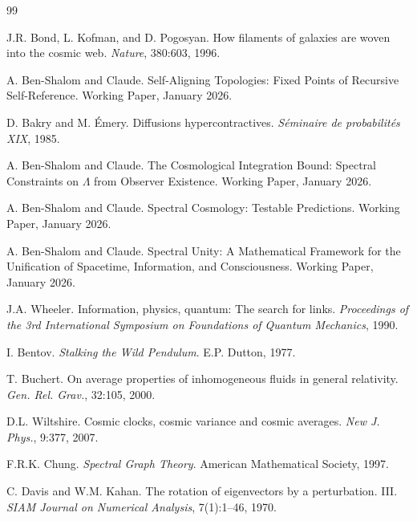 \documentclass[11pt,a4paper]{article}
\theoremstyle{plain}
\theoremstyle{definition}
\theoremstyle{remark}
\begin{document}
\begin{thebibliography}{99}

J.R. Bond, L. Kofman, and D. Pogosyan.
\newblock How filaments of galaxies are woven into the cosmic web.
\newblock \emph{Nature}, 380:603, 1996.

A. Ben-Shalom and Claude.
\newblock Self-Aligning Topologies: Fixed Points of Recursive Self-Reference.
\newblock Working Paper, January 2026.

D. Bakry and M. \'{E}mery.
\newblock Diffusions hypercontractives.
\newblock \emph{S\'{e}minaire de probabilit\'{e}s XIX}, 1985.

A. Ben-Shalom and Claude.
\newblock The Cosmological Integration Bound: Spectral Constraints on $\Lambda$ from Observer Existence.
\newblock Working Paper, January 2026.

A. Ben-Shalom and Claude.
\newblock Spectral Cosmology: Testable Predictions.
\newblock Working Paper, January 2026.

A. Ben-Shalom and Claude.
\newblock Spectral Unity: A Mathematical Framework for the Unification of Spacetime, Information, and Consciousness.
\newblock Working Paper, January 2026.

J.A. Wheeler.
\newblock Information, physics, quantum: The search for links.
\newblock \emph{Proceedings of the 3rd International Symposium on Foundations of Quantum Mechanics}, 1990.

I. Bentov.
\newblock \emph{Stalking the Wild Pendulum}.
\newblock E.P. Dutton, 1977.

T. Buchert.
\newblock On average properties of inhomogeneous fluids in general relativity.
\newblock \emph{Gen. Rel. Grav.}, 32:105, 2000.

D.L. Wiltshire.
\newblock Cosmic clocks, cosmic variance and cosmic averages.
\newblock \emph{New J. Phys.}, 9:377, 2007.

F.R.K. Chung.
\newblock \emph{Spectral Graph Theory}.
\newblock American Mathematical Society, 1997.

C. Davis and W.M. Kahan.
\newblock The rotation of eigenvectors by a perturbation. III.
\newblock \emph{SIAM Journal on Numerical Analysis}, 7(1):1--46, 1970.

\end{thebibliography}
\end{document}
